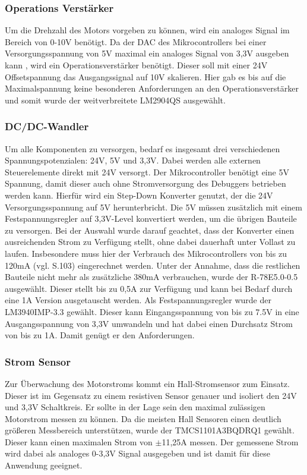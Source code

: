 \subsubsection{Operations Verstärker}
Um die Drehzahl des Motors vorgeben zu können, wird ein analoges Signal im Bereich von 0-10V benötigt. Da der \ac{DAC} des Mikrocontrollers bei einer Versorgungsspannung von 5V maximal ein analoges Signal von 3,3V ausgeben kann \cite{STM32}, wird ein Operationsverstärker benötigt. Dieser soll mit einer 24V Offsetspannung das Ausgangssignal auf 10V skalieren. Hier gab es bis auf die Maximalspannung keine besonderen Anforderungen an den Operationsverstärker und somit wurde der weitverbreitete LM2904QS ausgewählt.
\subsubsection{DC/DC-Wandler}
Um alle Komponenten zu versorgen, bedarf es insgesamt drei verschiedenen Spannungspotenzialen: 24V, 5V und 3,3V. Dabei werden alle externen Steuerelemente direkt mit 24V versorgt. Der Mikrocontroller benötigt eine 5V Spannung, damit dieser auch ohne Stromversorgung des Debuggers betrieben werden kann. Hierfür wird ein Step-Down Konverter genutzt, der die 24V Versorgungsspannung auf 5V herunterbricht. Die 5V müssen zusätzlich mit einem Festspannungsregler auf 3,3V-Level konvertiert werden, um die übrigen Bauteile zu versorgen. Bei der Auswahl wurde darauf geachtet, dass der Konverter einen ausreichenden Strom zu Verfügung stellt, ohne dabei dauerhaft unter Vollast zu laufen. Insbesondere muss hier der Verbrauch des Mikrocontrollers von bis zu 120mA (vgl. \cite{STM32_Electrical} S.103) eingerechnet werden. Unter der Annahme, dass die restlichen Bauteile nicht mehr als zusätzliche 380mA verbrauchen, wurde der R-78E5.0-0.5 ausgewählt. Dieser stellt bis zu 0,5A zur Verfügung und kann bei Bedarf durch eine 1A Version ausgetauscht werden. Als Festspannungsregler wurde der LM3940IMP-3.3 gewählt. Dieser kann Eingangsspannung von bis zu 7.5V in eine Ausgangsspannung von 3,3V umwandeln und hat dabei einen Durchsatz Strom von bis zu 1A. Damit genügt er den Anforderungen.
\subsubsection{Strom Sensor}
Zur Überwachung des Motorstroms kommt ein Hall-Stromsensor zum Einsatz. Dieser ist im Gegensatz zu einem resistiven Sensor genauer und isoliert den 24V und 3,3V Schaltkreis. Er sollte in der Lage sein den maximal zulässigen Motorstrom messen zu können. Da die meisten Hall Sensoren einen deutlich größeren Messbereich unterstützen, wurde der TMCS1101A3BQDRQ1 gewählt. Dieser kann einen maximalen Strom von $\pm$11,25A messen. Der gemessene Strom wird dabei als analoges 0-3,3V Signal ausgegeben und ist damit für diese Anwendung geeignet.
